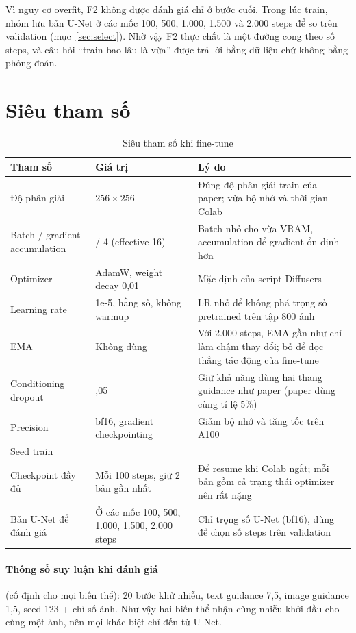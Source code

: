 \documentclass[12pt,a4paper]{article}
\begin{document}
Vì nguy cơ overfit, F2 không được đánh giá chỉ ở bước cuối. Trong lúc train, nhóm lưu
bản U-Net ở các mốc 100, 500, 1.000, 1.500 và 2.000 steps để so trên validation
(mục~\ref{sec:select}). Nhờ vậy F2 thực chất là một đường cong theo số steps, và câu
hỏi ``train bao lâu là vừa'' được trả lời bằng dữ liệu chứ không bằng phỏng đoán.

\section{Siêu tham số}

\begin{table}[H]
\centering
\caption{Siêu tham số khi fine-tune}
\small
\begin{tabular}{>{\raggedright\arraybackslash}p{3.6cm}>{\raggedright\arraybackslash}p{4.4cm}>{\raggedright\arraybackslash}p{6.6cm}}
\toprule
Tham số & Giá trị & Lý do \\
\midrule
Độ phân giải & $256\times256$ & Đúng độ phân giải train của paper; vừa bộ nhớ và thời
gian Colab \\
Batch / gradient accumulation & 4 / 4 (effective 16) & Batch nhỏ cho vừa VRAM,
accumulation để gradient ổn định hơn \\
Optimizer & AdamW, weight decay 0,01 & Mặc định của script Diffusers \\
Learning rate & 1e-5, hằng số, không warmup & LR nhỏ để không phá trọng số
pretrained trên tập 800 ảnh \\
EMA & Không dùng & Với 2.000 steps, EMA gần như chỉ làm chậm thay đổi; bỏ để đọc
thẳng tác động của fine-tune \\
Conditioning dropout & 0,05 & Giữ khả năng dùng hai thang guidance như paper (paper
dùng cùng tỉ lệ 5\%) \\
Precision & bf16, gradient checkpointing & Giảm bộ nhớ và tăng tốc trên A100 \\
Seed train & 42 & \\
Checkpoint đầy đủ & Mỗi 100 steps, giữ 2 bản gần nhất & Để resume khi Colab ngắt;
mỗi bản gồm cả trạng thái optimizer nên rất nặng \\
Bản U-Net để đánh giá & Ở các mốc 100, 500, 1.000, 1.500, 2.000 steps & Chỉ trọng số
U-Net (bf16), dùng để chọn số steps trên validation \\
\bottomrule
\end{tabular}
\end{table}

\paragraph{Thông số suy luận khi đánh giá} (cố định cho mọi biến thể): 20 bước khử
nhiễu, text guidance 7,5, image guidance 1,5, seed 123 + chỉ số ảnh. Như vậy hai biến
thể nhận cùng nhiễu khởi đầu cho cùng một ảnh, nên mọi khác biệt chỉ đến từ U-Net.
\end{document}
